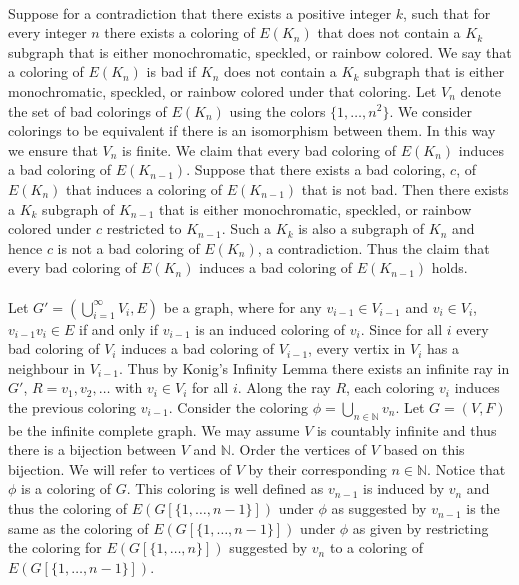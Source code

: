 \documentclass[letterpaper,12pt,oneside,onecolumn]{article}
\newcommand{\N}{\mathbb{N}} \newcommand{\R}{\mathbb{R}}
\begin{document}
\paragraph{}
Suppose for a contradiction that there exists a positive integer $k$, such that for every integer $n$ there exists a coloring of $E(K_n)$ that does not contain a $K_k$ subgraph that is either monochromatic, speckled, or rainbow colored. We say that a coloring of $E(K_n)$ is bad if $K_n$ does not contain a $K_k$ subgraph that is either monochromatic, speckled, or rainbow colored under that coloring. Let $V_n$ denote the set of bad colorings of $E(K_n)$ using the colors $\{1,\dots, n^2\}$. We consider colorings to be equivalent if there is an isomorphism between them. In this way we ensure that $V_n$ is finite. We claim that every bad coloring of $E(K_n)$ induces a bad coloring of $E(K_{n-1})$. Suppose that there exists a bad coloring, $c$, of $E(K_n)$ that induces a coloring of $E(K_{n-1})$ that is not bad. Then there exists a $K_k$ subgraph of $K_{n-1}$ that is either monochromatic, speckled, or rainbow colored under $c$ restricted to $K_{n-1}$. Such a $K_k$ is also a subgraph of $K_n$ and hence $c$ is not a bad coloring of $E(K_n)$, a contradiction. Thus the claim that every bad coloring of $E(K_n)$ induces a bad coloring of $E(K_{n-1})$ holds.
\paragraph{}
Let $G' = (\bigcup_{i=1}^\infty V_i, E)$ be a graph, where for any $v_{i-1} \in V_{i-1}$ and $ v_i \in V_i$, $v_{i-1}v_i \in E$ if and only if $v_{i-1}$ is an induced coloring of $v_i$. Since for all $i$ every bad coloring of $V_i$ induces a bad coloring of $V_{i-1}$, every vertix in $V_i$ has a neighbour in $V_{i-1}$. Thus by Konig's Infinity Lemma there exists an infinite ray in $G'$, $R=v_1,v_2,\dots$ with $v_i \in V_i$ for all $i$. Along the ray $R$, each coloring $v_i$ induces the previous coloring $v_{i-1}$. Consider the coloring $\phi = \bigcup_{n \in \N} v_n$. Let $G=(V,F)$ be the infinite complete graph. We may assume $V$ is countably infinite and thus there is a bijection between $V$ and $\N$. Order the vertices of $V$ based on this bijection. We will refer to vertices of $V$ by their corresponding $n \in \N$. Notice that $\phi$ is a coloring of $G$. This coloring is well defined as $v_{n-1}$ is induced by $v_n$ and thus the coloring of $E(G[\{1,\dots,n-1\}])$ under $\phi$ as suggested by $v_{n-1}$ is the same as the coloring of $E(G[\{1,\dots,n-1\}])$ under $\phi$ as given by restricting the coloring for $E(G[\{1,\dots,n\}])$ suggested by $v_n$ to a coloring of $E(G[\{1,\dots, n-1\}])$. 
\end{document}
